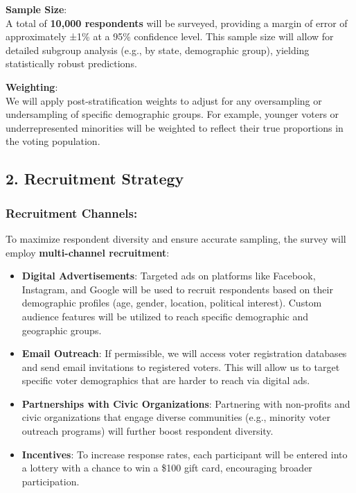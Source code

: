 \documentclass[
  letterpaper,
  DIV=11,
  numbers=noendperiod]{scrartcl}
\providecommand{\tightlist}{%
  \setlength{\itemsep}{0pt}\setlength{\parskip}{0pt}}\usepackage{longtable,booktabs,array}
\begin{document}
\textbf{Sample Size}:\\
A total of \textbf{10,000 respondents} will be surveyed, providing a
margin of error of approximately ±1\% at a 95\% confidence level. This
sample size will allow for detailed subgroup analysis (e.g., by state,
demographic group), yielding statistically robust predictions.

\textbf{Weighting}:\\
We will apply post-stratification weights to adjust for any oversampling
or undersampling of specific demographic groups. For example, younger
voters or underrepresented minorities will be weighted to reflect their
true proportions in the voting population.

\subsection{\texorpdfstring{\textbf{2. Recruitment
Strategy}}{2. Recruitment Strategy}}\label{recruitment-strategy}

\subsubsection{\texorpdfstring{\textbf{Recruitment
Channels}:}{Recruitment Channels:}}\label{recruitment-channels}

To maximize respondent diversity and ensure accurate sampling, the
survey will employ \textbf{multi-channel recruitment}:

\begin{itemize}
\tightlist
\item
  \textbf{Digital Advertisements}: Targeted ads on platforms like
  Facebook, Instagram, and Google will be used to recruit respondents
  based on their demographic profiles (age, gender, location, political
  interest). Custom audience features will be utilized to reach specific
  demographic and geographic groups.
\item
  \textbf{Email Outreach}: If permissible, we will access voter
  registration databases and send email invitations to registered
  voters. This will allow us to target specific voter demographics that
  are harder to reach via digital ads.
\item
  \textbf{Partnerships with Civic Organizations}: Partnering with
  non-profits and civic organizations that engage diverse communities
  (e.g., minority voter outreach programs) will further boost respondent
  diversity.
\item
  \textbf{Incentives}: To increase response rates, each participant will
  be entered into a lottery with a chance to win a \$100 gift card,
  encouraging broader participation.
\end{itemize}
\end{document}
